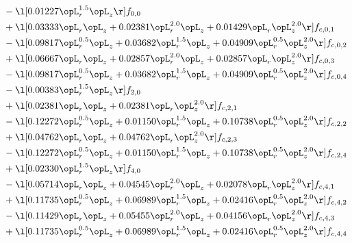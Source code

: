 \begin{alignat}{2}
& - \l[  0.01227 \opL_r^{1.5} \opL_z  \r] f_{0,0} \nonumber \\ 
& + \l[  0.03333 \opL_r \opL_z +  0.02381 \opL_r^{2.0} \opL_z +  0.01429 \opL_r \opL_z^{2.0}  \r] f_{c,0,1} \nonumber \\ 
& - \l[  0.09817 \opL_r^{0.5} \opL_z +  0.03682 \opL_r^{1.5} \opL_z +  0.04909 \opL_r^{0.5} \opL_z^{2.0}  \r] f_{c,0,2} \nonumber \\ 
& + \l[  0.06667 \opL_r \opL_z +  0.02857 \opL_r^{2.0} \opL_z +  0.02857 \opL_r \opL_z^{2.0}  \r] f_{c,0,3} \nonumber \\ 
& - \l[  0.09817 \opL_r^{0.5} \opL_z +  0.03682 \opL_r^{1.5} \opL_z +  0.04909 \opL_r^{0.5} \opL_z^{2.0}  \r] f_{c,0,4} \nonumber \\ 
& - \l[  0.00383 \opL_r^{1.5} \opL_z  \r] f_{2,0} \nonumber \\ 
& + \l[  0.02381 \opL_r \opL_z +  0.02381 \opL_r \opL_z^{2.0}  \r] f_{c,2,1} \nonumber \\ 
& - \l[  0.12272 \opL_r^{0.5} \opL_z +  0.01150 \opL_r^{1.5} \opL_z +  0.10738 \opL_r^{0.5} \opL_z^{2.0}  \r] f_{c,2,2} \nonumber \\ 
& + \l[  0.04762 \opL_r \opL_z +  0.04762 \opL_r \opL_z^{2.0}  \r] f_{c,2,3} \nonumber \\ 
& - \l[  0.12272 \opL_r^{0.5} \opL_z +  0.01150 \opL_r^{1.5} \opL_z +  0.10738 \opL_r^{0.5} \opL_z^{2.0}  \r] f_{c,2,4} \nonumber \\ 
& + \l[  0.02330 \opL_r^{1.5} \opL_z  \r] f_{4,0} \nonumber \\ 
& - \l[  0.05714 \opL_r \opL_z +  0.04545 \opL_r^{2.0} \opL_z +  0.02078 \opL_r \opL_z^{2.0}  \r] f_{c,4,1} \nonumber \\ 
& + \l[  0.11735 \opL_r^{0.5} \opL_z +  0.06989 \opL_r^{1.5} \opL_z +  0.02416 \opL_r^{0.5} \opL_z^{2.0}  \r] f_{c,4,2} \nonumber \\ 
& - \l[  0.11429 \opL_r \opL_z +  0.05455 \opL_r^{2.0} \opL_z +  0.04156 \opL_r \opL_z^{2.0}  \r] f_{c,4,3} \nonumber \\ 
& + \l[  0.11735 \opL_r^{0.5} \opL_z +  0.06989 \opL_r^{1.5} \opL_z +  0.02416 \opL_r^{0.5} \opL_z^{2.0}  \r] f_{c,4,4} \nonumber \\ 
\end{alignat} 


